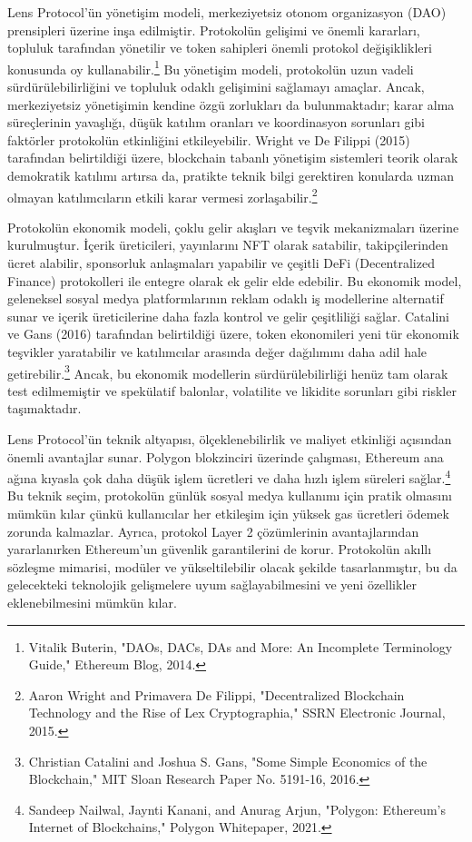 \documentclass[11pt,a4paper]{article}
\begin{document}
Lens Protocol'ün yönetişim modeli, merkeziyetsiz otonom organizasyon (DAO) prensipleri üzerine inşa edilmiştir. Protokolün gelişimi ve önemli kararları, topluluk tarafından yönetilir ve token sahipleri önemli protokol değişiklikleri konusunda oy kullanabilir.\footnote{Vitalik Buterin, "DAOs, DACs, DAs and More: An Incomplete Terminology Guide," Ethereum Blog, 2014.} Bu yönetişim modeli, protokolün uzun vadeli sürdürülebilirliğini ve topluluk odaklı gelişimini sağlamayı amaçlar. Ancak, merkeziyetsiz yönetişimin kendine özgü zorlukları da bulunmaktadır; karar alma süreçlerinin yavaşlığı, düşük katılım oranları ve koordinasyon sorunları gibi faktörler protokolün etkinliğini etkileyebilir. Wright ve De Filippi (2015) tarafından belirtildiği üzere, blockchain tabanlı yönetişim sistemleri teorik olarak demokratik katılımı artırsa da, pratikte teknik bilgi gerektiren konularda uzman olmayan katılımcıların etkili karar vermesi zorlaşabilir.\footnote{Aaron Wright and Primavera De Filippi, "Decentralized Blockchain Technology and the Rise of Lex Cryptographia," SSRN Electronic Journal, 2015.}

Protokolün ekonomik modeli, çoklu gelir akışları ve teşvik mekanizmaları üzerine kurulmuştur. İçerik üreticileri, yayınlarını NFT olarak satabilir, takipçilerinden ücret alabilir, sponsorluk anlaşmaları yapabilir ve çeşitli DeFi (Decentralized Finance) protokolleri ile entegre olarak ek gelir elde edebilir. Bu ekonomik model, geleneksel sosyal medya platformlarının reklam odaklı iş modellerine alternatif sunar ve içerik üreticilerine daha fazla kontrol ve gelir çeşitliliği sağlar. Catalini ve Gans (2016) tarafından belirtildiği üzere, token ekonomileri yeni tür ekonomik teşvikler yaratabilir ve katılımcılar arasında değer dağılımını daha adil hale getirebilir.\footnote{Christian Catalini and Joshua S. Gans, "Some Simple Economics of the Blockchain," MIT Sloan Research Paper No. 5191-16, 2016.} Ancak, bu ekonomik modellerin sürdürülebilirliği henüz tam olarak test edilmemiştir ve spekülatif balonlar, volatilite ve likidite sorunları gibi riskler taşımaktadır.

Lens Protocol'ün teknik altyapısı, ölçeklenebilirlik ve maliyet etkinliği açısından önemli avantajlar sunar. Polygon blokzinciri üzerinde çalışması, Ethereum ana ağına kıyasla çok daha düşük işlem ücretleri ve daha hızlı işlem süreleri sağlar.\footnote{Sandeep Nailwal, Jaynti Kanani, and Anurag Arjun, "Polygon: Ethereum's Internet of Blockchains," Polygon Whitepaper, 2021.} Bu teknik seçim, protokolün günlük sosyal medya kullanımı için pratik olmasını mümkün kılar çünkü kullanıcılar her etkileşim için yüksek gas ücretleri ödemek zorunda kalmazlar. Ayrıca, protokol Layer 2 çözümlerinin avantajlarından yararlanırken Ethereum'un güvenlik garantilerini de korur. Protokolün akıllı sözleşme mimarisi, modüler ve yükseltilebilir olacak şekilde tasarlanmıştır, bu da gelecekteki teknolojik gelişmelere uyum sağlayabilmesini ve yeni özellikler eklenebilmesini mümkün kılar.
\end{document}

